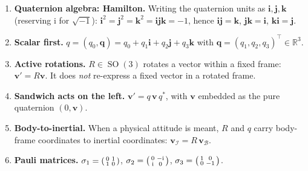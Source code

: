 \documentclass[11pt]{article}
\DeclareMathOperator{\SO}{SO}
\newcommand{\R}{\mathbb{R}}
\newcommand{\vv}[1]{\bm{#1}}
\newcommand{\ii}{\mathrm{i}}
\theoremstyle{plain}
\theoremstyle{definition}
\begin{document}
\begin{enumerate}[leftmargin=1.6em,label=(C\arabic*)]
\item \textbf{Quaternion algebra: Hamilton.} Writing the quaternion units as $\mathbf i,\mathbf j,\mathbf k$ (reserving $\ii$ for $\sqrt{-1}$): $\mathbf i^2=\mathbf j^2=\mathbf k^2=\mathbf i\mathbf j\mathbf k=-1$, hence $\mathbf i\mathbf j=\mathbf k$, $\mathbf j\mathbf k=\mathbf i$, $\mathbf k\mathbf i=\mathbf j$.
\item \textbf{Scalar first.} $q=(q_0,\vv q)=q_0+q_1\mathbf i+q_2\mathbf j+q_3\mathbf k$ with
$\vv q=(q_1,q_2,q_3)^{\!\top}\!\in\R^3$.
\item \textbf{Active rotations.} $R\in\SO(3)$ rotates a vector within a fixed frame:
$\vv v'=R\vv v$. It does \emph{not} re-express a fixed vector in a rotated frame.
\item \textbf{Sandwich acts on the left.} $\vv v'=q\,\vv v\,q^{*}$, with $\vv v$ embedded as the
pure quaternion $(0,\vv v)$.
\item \textbf{Body-to-inertial.} When a physical attitude is meant, $R$ and $q$ carry body-frame
coordinates to inertial coordinates: $\vv v_{\mathcal I}=R\,\vv v_{\mathcal B}$.
\item \textbf{Pauli matrices.} $\sigma_1=\begin{psmallmatrix}0&1\\1&0\end{psmallmatrix}$,
$\sigma_2=\begin{psmallmatrix}0&-\ii\\ \ii&0\end{psmallmatrix}$,
$\sigma_3=\begin{psmallmatrix}1&0\\0&-1\end{psmallmatrix}$.
\end{enumerate}
\end{document}
